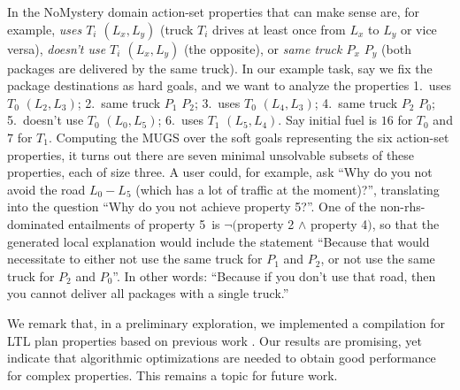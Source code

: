 In the NoMystery domain action-set properties that can make sense are,
for example, \emph{uses $T_i$ $(L_x,L_y)$} (truck $T_i$ drives at
least once from $L_x$ to $L_y$ or vice versa), \emph{doesn't use $T_i$
  $(L_x,L_y)$} (the opposite), or \emph{same truck $P_x$ $P_y$} (both
packages are delivered by the same truck). In our example task, say we
fix the package destinations as hard goals, and we want to analyze the
properties 1.\ uses $T_0$ $(L_2,L_3)$; 2.\ same truck $P_1$ $P_2$;
3.\ uses $T_0$ $(L_4,L_3)$; 4.\ same truck $P_2$ $P_0$; 5.\ doesn't
use $T_0$ $(L_0,L_5)$; 6.\ uses $T_1$ $(L_5,L_4)$. Say initial fuel is
$16$ for $T_0$ and $7$ for $T_1$. Computing the MUGS over the soft
goals representing the six action-set properties, it turns out there
are seven minimal unsolvable subsets of these properties, each of size
three. A user could, for example, ask ``Why do you not avoid the road
$L_0-L_5$ (which has a lot of traffic at the moment)?'', translating
into the question ``Why do you not achieve property 5?''. 
%
%
One of the non-rhs-dominated entailments of property 5\ is
$\neg($property 2 $\wedge$ property 4$)$, so that the generated local
explanation would include the statement ``Because that would
necessitate to either not use the same truck for $P_1$ and $P_2$, or
not use the same truck for $P_2$ and $P_0$''. In other words:
``Because if you don't use that road, then you cannot deliver all
packages with a single truck.''

%
%

We remark that, in a preliminary exploration, we implemented a
compilation for LTL plan properties based on previous work
\cite{edelkamp:icaps-06,baier:etal:ai-09}. Our results are promising,
yet indicate that algorithmic optimizations are needed to obtain good
performance for complex properties. This remains a topic for future
work.






